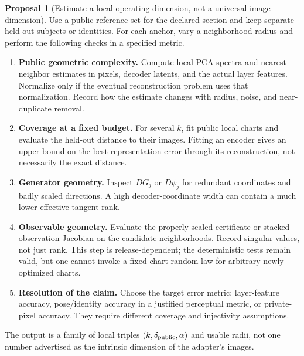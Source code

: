 \documentclass[11pt,a4paper]{article}
\theoremstyle{definition}
\theoremstyle{definition}
\newtheorem{proposal}[theorem]{Proposal}
\theoremstyle{remark}\newtheorem{remark}[theorem]{Remark}
\begin{document}
\begin{proposal}[Estimate a local operating dimension, not a universal image dimension]\label{pr:dimensionprotocol}
Use a public reference set for the declared section and keep separate held-out subjects or identities. For each anchor, vary a neighborhood radius and perform the following checks in a specified metric.
\begin{enumerate}
\item \textbf{Public geometric complexity.} Compute local PCA spectra and nearest-neighbor estimates in pixels, decoder latents, and the actual layer features. Normalize only if the eventual reconstruction problem uses that normalization. Record how the estimate changes with radius, noise, and near-duplicate removal.
\item \textbf{Coverage at a fixed budget.} For several $k$, fit public local charts and evaluate the held-out distance to their images. Fitting an encoder gives an upper bound on the best representation error through its reconstruction, not necessarily the exact distance.
\item \textbf{Generator geometry.} Inspect $DG_j$ or $D\psi_j$ for redundant coordinates and badly scaled directions. A high decoder-coordinate width can contain a much lower effective tangent rank.
\item \textbf{Observable geometry.} Evaluate the properly scaled certificate or stacked observation Jacobian on the candidate neighborhoods. Record singular values, not just rank. This step is release-dependent; the deterministic tests remain valid, but one cannot invoke a fixed-chart random law for arbitrary newly optimized charts.
\item \textbf{Resolution of the claim.} Choose the target error metric: layer-feature accuracy, pose/identity accuracy in a justified perceptual metric, or private-pixel accuracy. They require different coverage and injectivity assumptions.
\end{enumerate}
The output is a family of local triples $(k,\delta_{\rm public},\alpha)$ and usable radii, not one number advertised as the intrinsic dimension of the adapter's images.
\end{proposal}
\end{document}
